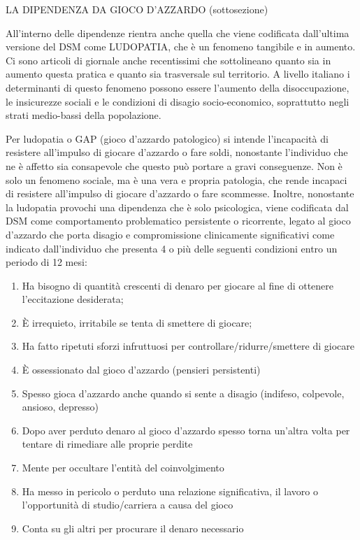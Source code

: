 \documentclass[]{article}
\begin{document}
LA DIPENDENZA DA GIOCO D'AZZARDO (sottosezione)

All'interno delle dipendenze rientra anche quella che viene codificata
dall'ultima versione del DSM come LUDOPATIA, che è un fenomeno tangibile
e in aumento. Ci sono articoli di giornale anche recentissimi che
sottolineano quanto sia in aumento questa pratica e quanto sia
trasversale sul territorio. A livello italiano i determinanti di questo
fenomeno possono essere l'aumento della disoccupazione, le insicurezze
sociali e le condizioni di disagio socio-economico, soprattutto negli
strati medio-bassi della popolazione.

Per ludopatia o GAP (gioco d'azzardo patologico) si intende l'incapacità
di resistere all'impulso di giocare d'azzardo o fare soldi, nonostante
l'individuo che ne è affetto sia consapevole che questo può portare a
gravi conseguenze. Non è solo un fenomeno sociale, ma è una vera e
propria patologia, che rende incapaci di resistere all'impulso di
giocare d'azzardo o fare scommesse. Inoltre, nonostante la ludopatia
provochi una dipendenza che è solo psicologica, viene codificata dal DSM
come comportamento problematico persistente o ricorrente, legato al
gioco d'azzardo che porta disagio e compromissione clinicamente
significativi come indicato dall'individuo che presenta 4 o più delle
seguenti condizioni entro un periodo di 12 mesi:

\begin{enumerate}
\def\labelenumi{\arabic{enumi}.}
\item
  Ha bisogno di quantità crescenti di denaro per giocare al fine di
  ottenere l'eccitazione desiderata;
\item
  È irrequieto, irritabile se tenta di smettere di giocare;
\item
  Ha fatto ripetuti sforzi infruttuosi per controllare/ridurre/smettere
  di giocare
\item
  È ossessionato dal gioco d'azzardo (pensieri persistenti)
\item
  Spesso gioca d'azzardo anche quando si sente a disagio (indifeso,
  colpevole, ansioso, depresso)
\item
  Dopo aver perduto denaro al gioco d'azzardo spesso torna un'altra
  volta per tentare di rimediare alle proprie perdite
\item
  Mente per occultare l'entità del coinvolgimento
\item
  Ha messo in pericolo o perduto una relazione significativa, il lavoro
  o l'opportunità di studio/carriera a causa del gioco
\item
  Conta su gli altri per procurare il denaro necessario
\end{enumerate}
\end{document}
